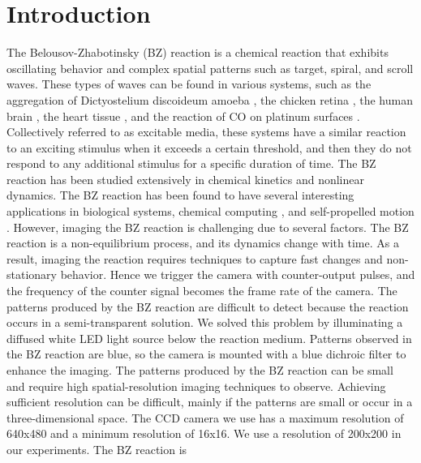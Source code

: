 \documentclass[journal=jacsat,manuscript=article]{achemso}
\begin{document}
\section{Introduction}
The Belousov-Zhabotinsky (BZ) reaction is a chemical reaction that
exhibits oscillating behavior and complex spatial patterns such as
target, spiral, and scroll waves. These types of waves can be found in
various systems, such as the aggregation of Dictyostelium discoideum
amoeba \cite{tan2020topological}, the chicken retina
\cite{yu2012reentrant}, the human brain \cite{rostami2018defects}, the
heart tissue \cite{lebert2023reconstruction}, and the reaction of CO
on platinum surfaces \cite{bhattacharya2019controlling}.  Collectively
referred to as excitable media, these systems have a similar
reaction to an exciting stimulus when it exceeds a certain threshold,
and then they do not respond to any additional stimulus for a specific
duration of time. The BZ reaction has been studied extensively in chemical kinetics and
nonlinear dynamics. The BZ reaction has been found to have several
interesting applications in biological systems, chemical computing
\cite{steinbock1996chemical}\cite{gruenert2013multi}, and
self-propelled motion
\cite{kumar2021fast}\cite{suematsu2018evolution}.
However, imaging the BZ reaction is challenging due to several
factors. The BZ reaction is a non-equilibrium process, and its
dynamics change with time. As a result, imaging the reaction requires
techniques to capture fast changes and non-stationary behavior. Hence
we trigger the camera with counter-output pulses, and the frequency of
the counter signal becomes the frame rate of the camera. The patterns
produced by the BZ reaction are difficult to detect because the
reaction occurs in a semi-transparent solution. We solved this problem
by illuminating a diffused white LED light source below the reaction
medium. Patterns observed in the BZ reaction are blue, so the
camera is mounted with a blue dichroic filter to enhance the
imaging. The patterns produced by the BZ reaction can be small and
require high spatial-resolution imaging techniques to
observe. Achieving sufficient resolution can be difficult, mainly if
the patterns are small or occur in a three-dimensional space. The CCD camera we use has a maximum resolution of 640x480 and a minimum resolution of 16x16. We use a resolution of 200x200 in our experiments. The BZ reaction is
\end{document}
